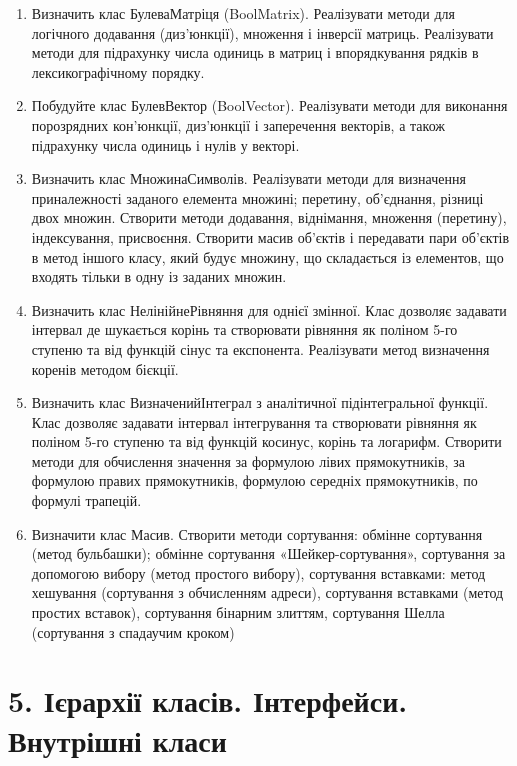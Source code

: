 \documentclass[]{article}
\begin{document}
\begin{enumerate}
\item
Визначить клас БулеваМатріця (BoolMatrix). Реалізувати методи для логічного додавання (диз'юнкції), множення і інверсії матриць. Реалізувати методи для підрахунку числа одиниць в матриц і впорядкування рядків в лексикографічному порядку.
\item
Побудуйте клас БулевВектор (BoolVector). Реалізувати методи для виконання порозрядних кон'юнкції, диз'юнкції і заперечення векторів, а також підрахунку числа одиниць і нулів у векторі.
\item
Визначить клас МножинаСимволів. Реалізувати методи для визначення приналежності заданого елемента множині; перетину, об'єднання, різниці двох множин. Створити методи додавання, віднімання, множення (перетину), індексування, присвоєння. Створити масив об'єктів і передавати пари об'єктів в метод іншого класу, який будує множину, що складається із елементов, що входять тільки в одну із заданих множин.
\item
Визначить клас НелінійнеРівняння для однієї змінної. Клас дозволяє задавати інтервал де шукається корінь та створювати рівняння як поліном 5-го ступеню та від функцій сінус та експонента. Реалізувати метод визначення коренів методом бієкції.
\item
Визначить клас ВизначенийІнтеграл з аналітичної підінтегральної функції. Клас дозволяє задавати інтервал інтегрування та створювати рівняння як поліном 5-го ступеню та від функцій косинус, корінь та логарифм. Створити методи для обчислення значення за формулою лівих прямокутників, за формулою правих прямокутників, формулою середніх прямокутників, по формулі трапецій.
\item
Визначити клас Масив. Створити методи сортування: обмінне сортування (метод бульбашки); обмінне сортування «Шейкер-сортування», сортування за допомогою вибору (метод простого вибору), сортування вставками: метод хешування (сортування з обчисленням адреси), сортування вставками (метод простих вставок), сортування бінарним злиттям, сортування Шелла (сортування з спадаучим кроком)
\end{enumerate}

\section{5. Ієрархії класів. Інтерфейси. Внутрішні класи}
\end{document}
